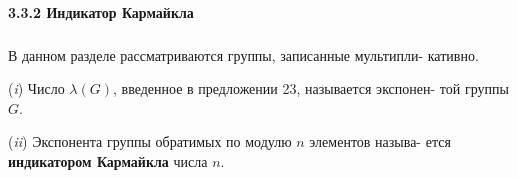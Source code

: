 \paragraph{3.3.2 Индикатор Кармайкла}
\subparagraph{}
В данном разделе рассматриваются группы, записанные мультипли­-\linebreak
кативно.
\begin{determ}
\par \quad\;  (\textit{i})	Число $\lambda (G)$, введенное в предложении 23, называется экспонен-\linebreak­
той группы $G$.
\par  (\textit{ii}) Экспонента группы обратимых по модулю $n$ элементов называ­-\linebreak
ется \textbf{индикатором Кармайкла} числа $n$.
\end{determ}
